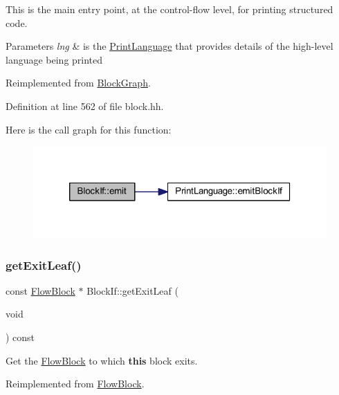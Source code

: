 This is the main entry point, at the control-\/flow level, for printing structured code. 
\begin{DoxyParams}{Parameters}
{\em lng} & is the \mbox{\hyperlink{class_print_language}{Print\+Language}} that provides details of the high-\/level language being printed \\
\hline
\end{DoxyParams}


Reimplemented from \mbox{\hyperlink{class_block_graph_a535d3c7cb13e5e45b6e121b024fa339f}{Block\+Graph}}.



Definition at line 562 of file block.\+hh.

Here is the call graph for this function\+:
\nopagebreak
\begin{figure}[H]
\begin{center}
\leavevmode
\includegraphics[width=320pt]{class_block_if_a81d526be9d8cca137f9008ac7a12d410_cgraph}
\end{center}
\end{figure}
\mbox{\label{class_block_if_a9adb3bd7302e374459669718f1265826}} 
\subsubsection{\texorpdfstring{getExitLeaf()}{getExitLeaf()}}
{\footnotesize\ttfamily const \mbox{\hyperlink{class_flow_block}{Flow\+Block}} $\ast$ Block\+If\+::get\+Exit\+Leaf (\begin{DoxyParamCaption}\item[{void}]{ }\end{DoxyParamCaption}) const\hspace{0.3cm}{\ttfamily [virtual]}}



Get the \mbox{\hyperlink{class_flow_block}{Flow\+Block}} to which {\bfseries{this}} block exits. 



Reimplemented from \mbox{\hyperlink{class_flow_block_a611bb926194635a0f5cfc0eb16cabe6a}{Flow\+Block}}.



